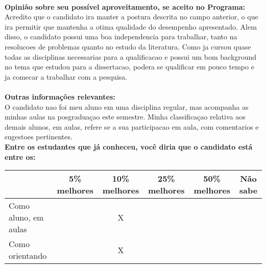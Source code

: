 \documentclass[11pt]{article}
\begin{document}
\\
\textbf{Opinião sobre seu possível aproveitamento, se aceito no Programa:}
\\Acredito que o candidato ira manter a postura descrita no campo anterior, o que ira permitir que mantenha a otima qualidade do desempenho apresentado. Alem disso, o candidato possui uma boa independencia para trabalhar, tanto na resolucoes de problemas quanto no estudo da literatura. Como ja cursou quase todas as disciplinas necessarias para a qualificacao e possui um bom background no tema que estudou para a dissertacao, podera se qualificar em pouco tempo e ja comecar a trabalhar com a pesquisa.\\ 
\\
\textbf{Outras informações relevantes:} \\O candidato nao foi meu aluno em uma disciplina regular, mas acompanha as minhas aulas na posgraduaçao este semestre. Minha classificaçao relativa aos demais alunos, em aulas, refere se a sua participacao em aula, com comentarios e sugestoes pertinentes.
\\[0.3cm]
\textbf{Entre os estudantes que já conheceu, você diria que o candidato está entre os:}
\\
\begin{tabular}{|l|c|c|c|c|c|}
\hline
 & 5\% melhores & 10\% melhores & 25\% melhores & 50\% melhores & Não sabe \\
\hline
Como aluno, em aulas &  & X &  &  & \\
\hline
Como orientando &  & X &  &  & \\
\hline
\end{tabular}
\end{document}
